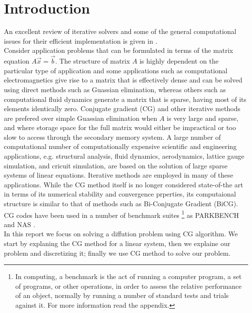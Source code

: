 \section*{Introduction}
An excellent review of iterative solvers and some of the general computational issues for their efficient 
implementation is given in \cite{barrett1994templates}. 
\\
Consider application problems that can be formulated in terms of the matrix equation $A \vec{x} = \vec{b}$. The structure of matrix $A$ is highly dependent on the particular type of application and some applications such as computational electromagnetics give rise to a matrix that is effectively dense \cite{cheng1995distributed} and can be solved using direct methods \cite{duff2017direct} such as Guassian elimination, whereas others such as computational fluid dynamics \cite{bogusz1994preliminary} generate a matrix that is sparse, having most of its elements identically zero. Conjugate gradient (CG) and other iterative methods are prefered over simple Guassian elimination when $A$ is very large and sparse, and where storage space for the full matrix would either be impractical or too slow to access through the secondary memory system. A large number of computational number of computationally expensive scientific and engineering applications, e.g. structural analysis, fluid dynamics, aerodynamics, lattice gauge simulation, and cricuit simulation, are based on the solution of large sparse systems of linear equations.
Iterative methods are employed in many of these applications. While the CG method itself is no longer considered state-of-the art in terms of its numerical stability and convergence prperties, its computaional structure is similar to that of methods such as Bi-Conjugate Gradient (BiCG). CG codes have been used in a number of benchmark suites
\footnote{In computing, a benchmark is the act of running a computer program, a set of programs, or other operations, in order to assess the relative performance of an object, normally by running a number of standard tests and trials against it. For more information read the appendix.}
as PARKBENCH \cite{hockney1994parkbench} and NAS \cite{bailey1995parallel}.\\

In this report we focus on solving a diffution problem using CG algorithm. We start by explaning the CG method for a linear system, then we explaine our problem and discretizing it; finally we use CG method to solve our problem. 
